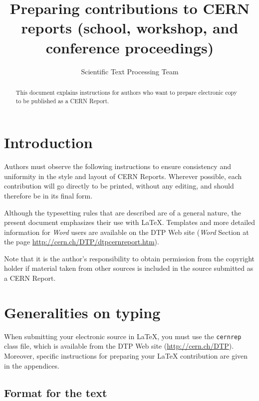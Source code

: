 \documentclass{cernrep}
\begin{document}
\title{Preparing contributions to CERN reports (school, workshop, and
conference proceedings)}
 
\author{Scientific Text Processing Team}


\maketitle %

 
\begin{abstract}
This document explains instructions for authors who want to prepare
electronic copy to be published as a CERN Report.
\end{abstract}
 
\section{Introduction}
 
Authors must observe the following instructions to ensure consistency
and uniformity in the style and layout of CERN Reports.  Wherever
possible, each contribution will go directly to be printed, without
any editing, and should therefore be in its final form.

Although the typesetting rules that are described are of a general
nature, the present document emphasizes their use with
\LaTeX. Templates and more detailed information for \emph{Word} users
are available on the DTP Web site (\emph{Word} Section at the page
\url{http://cern.ch/DTP/dtpcernreport.htm}).
 
Note that it is the author's responsibility to obtain permission from
the copyright holder if material taken from other sources is included
in the source submitted as a CERN Report.

\section{Generalities on typing}

When submitting your electronic source in \LaTeX{}, you must use the
\texttt{cernrep} class file, which is available from the DTP Web site
(\url{http://cern.ch/DTP}). Moreover, specific instructions for preparing
your \LaTeX{} contribution are given in the appendices.

\subsection{Format for the text}
 
\end{document}
